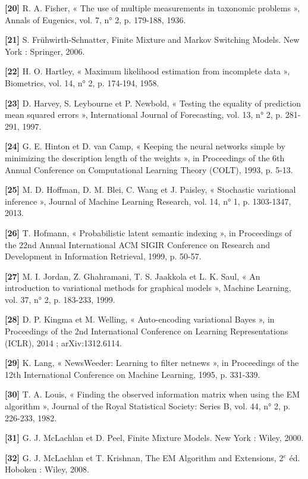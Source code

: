 \textbf{[20]  }R. A. Fisher, « The use of multiple measurements in taxonomic problems », Annals of Eugenics, vol. 7, n° 2, p. 179-188, 1936.

\textbf{[21]  }S. Frühwirth-Schnatter, Finite Mixture and Markov Switching Models. New York : Springer, 2006.

\textbf{[22]  }H. O. Hartley, « Maximum likelihood estimation from incomplete data », Biometrics, vol. 14, n° 2, p. 174-194, 1958.

\textbf{[23]  }D. Harvey, S. Leybourne et P. Newbold, « Testing the equality of prediction mean squared errors », International Journal of Forecasting, vol. 13, n° 2, p. 281-291, 1997.

\textbf{[24]  }G. E. Hinton et D. van Camp, « Keeping the neural networks simple by minimizing the description length of the weights », in Proceedings of the 6th Annual Conference on Computational Learning Theory (COLT), 1993, p. 5-13.

\textbf{[25]  }M. D. Hoffman, D. M. Blei, C. Wang et J. Paisley, « Stochastic variational inference », Journal of Machine Learning Research, vol. 14, n° 1, p. 1303-1347, 2013.

\textbf{[26]  }T. Hofmann, « Probabilistic latent semantic indexing », in Proceedings of the 22nd Annual International ACM SIGIR Conference on Research and Development in Information Retrieval, 1999, p. 50-57.

\textbf{[27]  }M. I. Jordan, Z. Ghahramani, T. S. Jaakkola et L. K. Saul, « An introduction to variational methods for graphical models », Machine Learning, vol. 37, n° 2, p. 183-233, 1999.

\textbf{[28]  }D. P. Kingma et M. Welling, « Auto-encoding variational Bayes », in Proceedings of the 2nd International Conference on Learning Representations (ICLR), 2014 ; arXiv:1312.6114.

\textbf{[29]  }K. Lang, « NewsWeeder: Learning to filter netnews », in Proceedings of the 12th International Conference on Machine Learning, 1995, p. 331-339.

\textbf{[30]  }T. A. Louis, « Finding the observed information matrix when using the EM algorithm », Journal of the Royal Statistical Society: Series B, vol. 44, n° 2, p. 226-233, 1982.

\textbf{[31]  }G. J. McLachlan et D. Peel, Finite Mixture Models. New York : Wiley, 2000.

\textbf{[32]  }G. J. McLachlan et T. Krishnan, The EM Algorithm and Extensions, 2$^{e}$ éd. Hoboken : Wiley, 2008.

